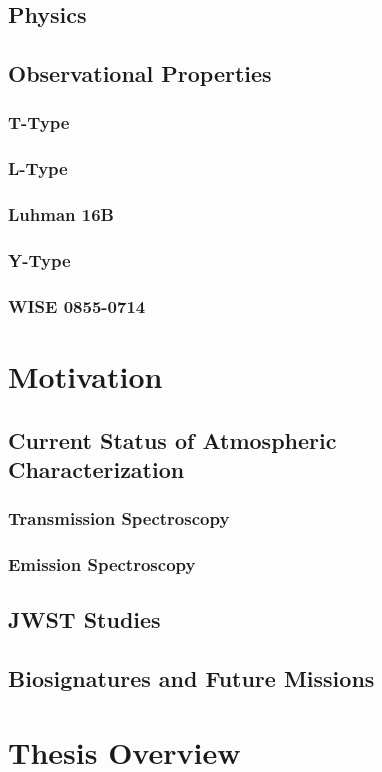 \subsection{Physics}
\subsection{Observational Properties}
\subsubsection{T-Type}
\subsubsection{L-Type}
\subsubsection{Luhman 16B}
\subsubsection{Y-Type}
\subsubsection{WISE 0855-0714}

\section{Motivation}
\subsection{Current Status of Atmospheric Characterization}
\parencite{Kreidberg2018}%
\parencite{Biller2018} %
\parencite{Bozza} %
\parencite{Danielski2018} %
\parencite{Madhusudhan2016} %
\subsubsection{Transmission Spectroscopy}
\parencite{Lee2012} %
\parencite{MacDonald2017} %
\parencite{Madhusudhan} %
\subsubsection{Emission Spectroscopy}
\subsection{JWST Studies}
\parencite{Beichman2019} %
\subsection{Biosignatures and Future Missions}
\section{Thesis Overview}